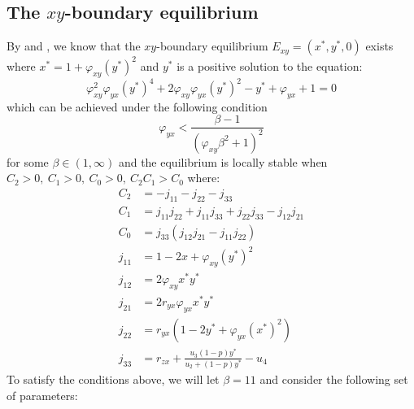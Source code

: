 \subsection{The $xy$-boundary equilibrium}\label{subsec:numsim_xy_boundary_equilibrium}
By  and , we know that the $xy$-boundary equilibrium $E_{xy}=\left(x^*,y^*,0\right)$ exists where $x^*=1+\varphi_{xy}\left(y^*\right)^2$ and $y^*$ is a positive solution to the equation:
\begin{equation*}
    \varphi_{xy}^2\varphi_{yx}\left(y^*\right)^4+2\varphi_{xy}\varphi_{yx}\left(y^*\right)^2-y^*+\varphi_{yx}+1=0
\end{equation*}
which can be achieved under the following condition
\begin{equation*}
    \varphi_{yx}<\frac{\beta-1}{\left(\varphi_{xy}\beta^2+1\right)^2}
\end{equation*}
for some $\beta\in\left(1, \infty\right)$ and the equilibrium is locally stable when $C_2>0,\ C_1>0,\ C_0>0,\ C_2C_1>C_0$ where:
\begin{align*}
    C_2 &= -j_{11}-j_{22}-j_{33}\\
    C_1 &= j_{11}j_{22}+j_{11}j_{33}+j_{22}j_{33}-j_{12}j_{21}\\
    C_0 &= j_{33}\left(j_{12}j_{21}-j_{11}j_{22}\right)\\
    j_{11} &= 1-2x+\varphi_{xy}\left(y^*\right)^2\\
    j_{12} &= 2\varphi_{xy}x^*y^*\\
    j_{21} &= 2r_{yx}\varphi_{yx}x^*y^*\\
    j_{22} &= r_{yx}\left(1-2y^*+\varphi_{yx}\left(x^*\right)^2\right)\\
    j_{33} &= r_{zx}+\frac{u_3\left(1-p\right)y^*}{u_2+\left(1-p\right)y^*}-u_4
\end{align*}
To satisfy the conditions above, we will let $\beta=11$ and consider the following set of parameters:
